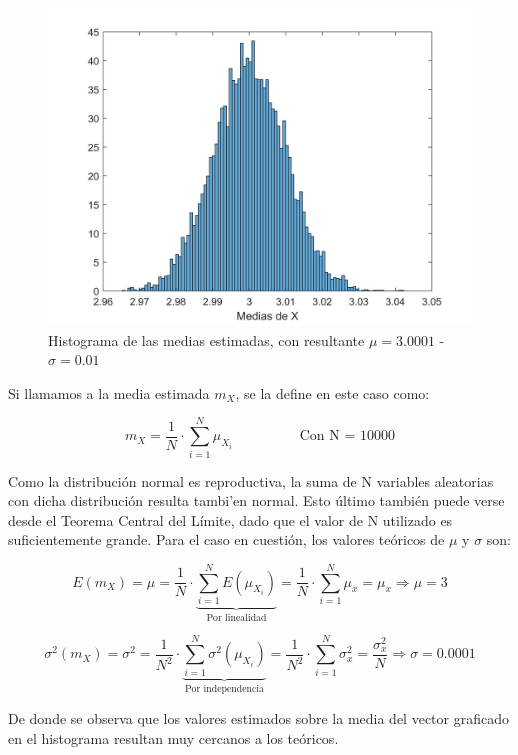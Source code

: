 \begin{figure}[!ht]
\begin{centering}
\includegraphics[scale=0.55]{Imagenes/MediasX.png}
\par\end{centering}
\caption{Histograma de las medias estimadas, con resultante $\mu = 3.0001$ - $\sigma = 0.01$}

\end{figure} 

Si llamamos a la media estimada $m_X$, se la define en este caso como:

\[
m_X = \frac{1}{N} \cdot \sum^N_{i=1} \mu_{X_i} \hspace{2cm} \textrm{Con N = 10000} 
\]

Como la distribuci\'on normal es reproductiva, la suma de N variables aleatorias con dicha distribuci\'on resulta tambi'en normal. Esto \'ultimo tambi\'en puede verse desde el Teorema Central del L\'imite, dado que el valor de N utilizado es suficientemente grande. Para el caso en cuesti\'on, los valores te\'oricos de $\mu$ y $\sigma$ son:

\[
E(m_X) = \mu = \frac{1}{N} \cdot \underbrace{\sum^N_{i=1} E(\mu_{X_i})}_{\textrm{Por linealidad}} = \frac{1}{N} \cdot \sum^N_{i=1} \mu_x = \mu_x \Longrightarrow \mu = 3
\]

\[
\sigma^2(m_X) = \sigma^2 = \frac{1}{N^2} \cdot \underbrace{\sum^N_{i=1} \sigma^2(\mu_{X_i})}_{\textrm{Por independencia}} = \frac{1}{N^2} \cdot \sum^N_{i=1} \sigma^2_x = \frac{\sigma^2_x}{N} \Longrightarrow \sigma = 0.0001
\]

De donde se observa que los valores estimados sobre la media del vector graficado en el histograma resultan muy cercanos a los te\'oricos.

